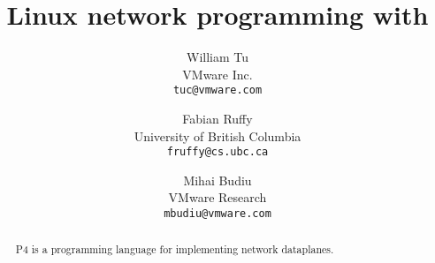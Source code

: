 \documentclass[10pt]{article}
\title{Linux network programming with \PFOUR}
\author{William Tu\\
  VMware Inc.\\
  \texttt{tuc@vmware.com}
  \and
  Fabian Ruffy\\
  University of British Columbia\\
  \texttt{fruffy@cs.ubc.ca}
  \and
  Mihai Budiu\\
  VMware Research\\
  \texttt{mbudiu@vmware.com}
}
\date{}
\newcommand{\PFOUR}{P4\xspace}
\begin{document}
\maketitle

\begin{abstract}
  \PFOUR is a programming language for implementing network dataplanes.
\end{abstract}







\end{document}
